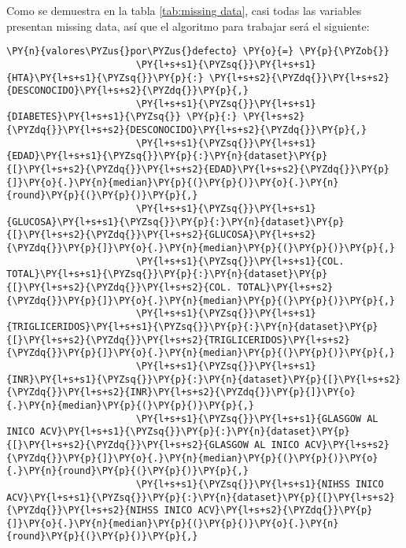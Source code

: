     Como se demuestra en la tabla \ref{tab:missing data}, casi todas las variables presentan missing data, así que el algoritmo para trabajar será el siguiente:

    \begin{tcolorbox}[breakable, size=fbox, boxrule=1pt, pad at break*=1mm,colback=cellbackground, colframe=cellborder]
\begin{Verbatim}[commandchars=\\\{\}]
\PY{n}{valores\PYZus{}por\PYZus{}defecto} \PY{o}{=} \PY{p}{\PYZob{}}
                       \PY{l+s+s1}{\PYZsq{}}\PY{l+s+s1}{HTA}\PY{l+s+s1}{\PYZsq{}}\PY{p}{:} \PY{l+s+s2}{\PYZdq{}}\PY{l+s+s2}{DESCONOCIDO}\PY{l+s+s2}{\PYZdq{}}\PY{p}{,}
                       \PY{l+s+s1}{\PYZsq{}}\PY{l+s+s1}{DIABETES}\PY{l+s+s1}{\PYZsq{}} \PY{p}{:} \PY{l+s+s2}{\PYZdq{}}\PY{l+s+s2}{DESCONOCIDO}\PY{l+s+s2}{\PYZdq{}}\PY{p}{,}
                       \PY{l+s+s1}{\PYZsq{}}\PY{l+s+s1}{EDAD}\PY{l+s+s1}{\PYZsq{}}\PY{p}{:}\PY{n}{dataset}\PY{p}{[}\PY{l+s+s2}{\PYZdq{}}\PY{l+s+s2}{EDAD}\PY{l+s+s2}{\PYZdq{}}\PY{p}{]}\PY{o}{.}\PY{n}{median}\PY{p}{(}\PY{p}{)}\PY{o}{.}\PY{n}{round}\PY{p}{(}\PY{p}{)}\PY{p}{,}
                       \PY{l+s+s1}{\PYZsq{}}\PY{l+s+s1}{GLUCOSA}\PY{l+s+s1}{\PYZsq{}}\PY{p}{:}\PY{n}{dataset}\PY{p}{[}\PY{l+s+s2}{\PYZdq{}}\PY{l+s+s2}{GLUCOSA}\PY{l+s+s2}{\PYZdq{}}\PY{p}{]}\PY{o}{.}\PY{n}{median}\PY{p}{(}\PY{p}{)}\PY{p}{,}
                       \PY{l+s+s1}{\PYZsq{}}\PY{l+s+s1}{COL. TOTAL}\PY{l+s+s1}{\PYZsq{}}\PY{p}{:}\PY{n}{dataset}\PY{p}{[}\PY{l+s+s2}{\PYZdq{}}\PY{l+s+s2}{COL. TOTAL}\PY{l+s+s2}{\PYZdq{}}\PY{p}{]}\PY{o}{.}\PY{n}{median}\PY{p}{(}\PY{p}{)}\PY{p}{,} 
                       \PY{l+s+s1}{\PYZsq{}}\PY{l+s+s1}{TRIGLICERIDOS}\PY{l+s+s1}{\PYZsq{}}\PY{p}{:}\PY{n}{dataset}\PY{p}{[}\PY{l+s+s2}{\PYZdq{}}\PY{l+s+s2}{TRIGLICERIDOS}\PY{l+s+s2}{\PYZdq{}}\PY{p}{]}\PY{o}{.}\PY{n}{median}\PY{p}{(}\PY{p}{)}\PY{p}{,}
                       \PY{l+s+s1}{\PYZsq{}}\PY{l+s+s1}{INR}\PY{l+s+s1}{\PYZsq{}}\PY{p}{:}\PY{n}{dataset}\PY{p}{[}\PY{l+s+s2}{\PYZdq{}}\PY{l+s+s2}{INR}\PY{l+s+s2}{\PYZdq{}}\PY{p}{]}\PY{o}{.}\PY{n}{median}\PY{p}{(}\PY{p}{)}\PY{p}{,}
                       \PY{l+s+s1}{\PYZsq{}}\PY{l+s+s1}{GLASGOW AL INICO ACV}\PY{l+s+s1}{\PYZsq{}}\PY{p}{:}\PY{n}{dataset}\PY{p}{[}\PY{l+s+s2}{\PYZdq{}}\PY{l+s+s2}{GLASGOW AL INICO ACV}\PY{l+s+s2}{\PYZdq{}}\PY{p}{]}\PY{o}{.}\PY{n}{median}\PY{p}{(}\PY{p}{)}\PY{o}{.}\PY{n}{round}\PY{p}{(}\PY{p}{)}\PY{p}{,}
                       \PY{l+s+s1}{\PYZsq{}}\PY{l+s+s1}{NIHSS INICO ACV}\PY{l+s+s1}{\PYZsq{}}\PY{p}{:}\PY{n}{dataset}\PY{p}{[}\PY{l+s+s2}{\PYZdq{}}\PY{l+s+s2}{NIHSS INICO ACV}\PY{l+s+s2}{\PYZdq{}}\PY{p}{]}\PY{o}{.}\PY{n}{median}\PY{p}{(}\PY{p}{)}\PY{o}{.}\PY{n}{round}\PY{p}{(}\PY{p}{)}\PY{p}{,} 

\end{Verbatim}
\end{tcolorbox}
